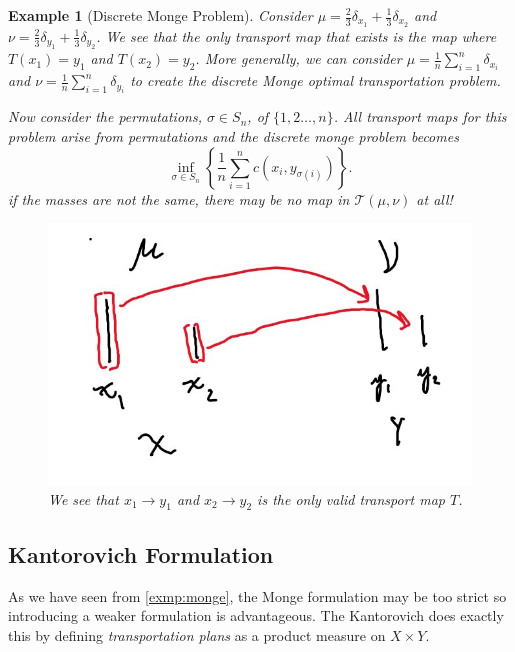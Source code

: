 \documentclass[12pt]{article}
\theoremstyle{plain}
\newtheorem{exmp}{Example}[section]
\numberwithin{equation}{section}
\begin{document}
\begin{exmp}[Discrete Monge Problem]\label{exmp:monge}
Consider $\mu = \frac{2}{3}\delta_{x_1} + \frac{1}{3}\delta_{x_2}$ and $\nu = \frac{2}{3}\delta_{y_1} + \frac{1}{3}\delta_{y_2}$. We see that the only transport map that exists is the map where $T(x_1) = y_1$ and $T(x_2)=y_2$.
More generally, we can consider $\mu = \frac{1}{n}\sum_{i=1}^n\delta_{x_i}$ and $\nu = \frac{1}{n}\sum_{i=1}^n\delta_{y_i}$ to create the discrete Monge optimal transportation problem.

Now consider the permutations, $\sigma\in S_n$, of $\{1,2\dots,n\}$. All transport maps for this problem arise from permutations and the discrete monge problem becomes
\[\inf_{\sigma\in S_n}\left\{\frac{1}{n}\sum_{i=1}^nc(x_i,y_{\sigma(i)})\right\}.\]
if the masses are not the same, there may be no map in $\mathcal{T}(\mu,\nu)$ at all!
\begin{figure}[H]
  \center
  \includegraphics[scale=0.3]{monge.jpg}
  \caption{We see that $x_1\to y_1$ and $x_2\to y_2$ is the only valid transport map $T$.}
  \label{fig:monge}
\end{figure}
\end{exmp}
\subsection{Kantorovich Formulation}
As we have seen from \autoref{exmp:monge}, the Monge formulation may be too strict so introducing a weaker formulation is advantageous. The Kantorovich does exactly this by defining \textit{transportation plans} as a product measure on $X\times Y$.
\end{document}
